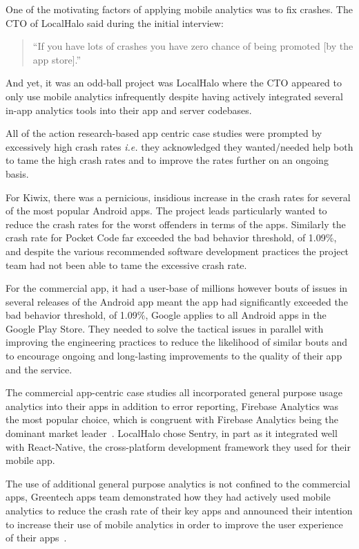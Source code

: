 One of the motivating factors of applying mobile analytics was to fix crashes. The CTO of LocalHalo said during the initial interview: 

\begin{quote}
    ``If you have lots of crashes you have zero chance of being promoted [by the app store].''
\end{quote}

And yet, it was an odd-ball project was LocalHalo where the CTO appeared to only use mobile analytics infrequently despite having actively integrated several in-app analytics tools into their app and server codebases.

All of the action research-based app centric case studies were prompted by excessively high crash rates \emph{i.e.} they acknowledged they wanted/needed help both to tame the high crash rates and to improve the rates further on an ongoing basis.

For Kiwix, there was a pernicious, insidious increase in the crash rates for several of the most popular Android apps. The project leads particularly wanted to reduce the crash rates for the worst offenders in terms of the apps. Similarly the crash rate for Pocket Code far exceeded the bad behavior threshold, of 1.09\%, and despite the various recommended software development practices the project team had not been able to tame the excessive crash rate.

For the commercial app, it had a user-base of millions however bouts of issues in several releases of the Android app meant the app had significantly exceeded the bad behavior threshold, of 1.09\%, Google applies to all Android apps in the Google Play Store. They needed to solve the tactical issues in parallel with improving the engineering practices to reduce the likelihood of similar bouts and to encourage ongoing and long-lasting improvements to the quality of their app and the service. 

The commercial app-centric case studies all incorporated general purpose usage analytics into their apps in addition to error reporting, Firebase Analytics was the most popular choice, which is congruent with Firebase Analytics being the dominant market leader~\citep{appbrain_firebase}. LocalHalo chose Sentry, in part as it integrated well with React-Native, the cross-platform development framework they used for their mobile app.

The use of additional general purpose analytics is not confined to the commercial apps, Greentech apps team demonstrated how they had actively used mobile analytics to reduce the crash rate of their key apps and announced their intention to increase their use of mobile analytics in order to improve the user experience of their apps~\citep{gtafblog2021_gtaf_accomplishment_2020}. 

